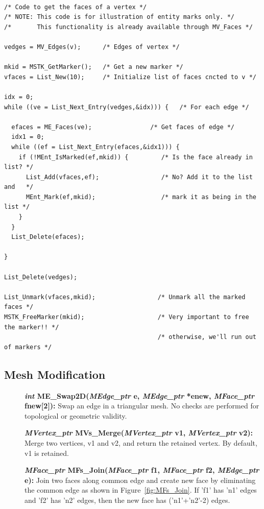 \documentclass[12pt]{article}
\begin{document}
\newpage
\begin{verbatim}

/* Code to get the faces of a vertex */
/* NOTE: This code is for illustration of entity marks only. */
/*       This functionality is already available through MV_Faces */

vedges = MV_Edges(v);      /* Edges of vertex */

mkid = MSTK_GetMarker();   /* Get a new marker */
vfaces = List_New(10);     /* Initialize list of faces cncted to v */

idx = 0;
while ((ve = List_Next_Entry(vedges,&idx))) {   /* For each edge */

  efaces = ME_Faces(ve);                /* Get faces of edge */
  idx1 = 0;
  while ((ef = List_Next_Entry(efaces,&idx1))) {
    if (!MEnt_IsMarked(ef,mkid)) {         /* Is the face already in list? */
      List_Add(vfaces,ef);                 /* No? Add it to the list and   */
      MEnt_Mark(ef,mkid);                  /* mark it as being in the list */
    }
  }
  List_Delete(efaces);

}

List_Delete(vedges);

List_Unmark(vfaces,mkid);                 /* Unmark all the marked faces */
MSTK_FreeMarker(mkid);                    /* Very important to free the marker!! */
                                          /* otherwise, we'll run out of markers */
\end{verbatim}



\newpage
\subsection{Mesh Modification}

\begin{description}

\item[]{\bf {\em int} ME\_Swap2D({\em MEdge\_ptr} e,
{\em MEdge\_ptr} *enew, {\em MFace\_ptr} fnew[2]):} Swap an edge
in a triangular mesh. No checks are performed for topological or
geometric validity.

\item[]{\bf {\em MVertex\_ptr} MVs\_Merge({\em MVertex\_ptr} v1, {\em
      MVertex\_ptr} v2):} Merge two vertices, v1 and v2, and return
  the retained vertex. By default, v1 is retained.

\item[]{\bf {\em MFace\_ptr} MFs\_Join({\em MFace\_ptr} f1,
{\em MFace\_ptr} f2, {\em MEdge\_ptr} e):} Join two faces along
common edge and create new face by eliminating the common edge as
shown in Figure~\ref{fig:MFs_Join}. If 'f1' has 'n1' edges and 'f2'
has 'n2' edges, then the new face has ('n1'+'n2'-2) edges.

\end{description}
\end{document}
